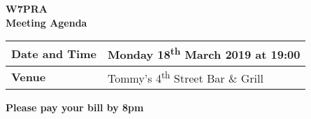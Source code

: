 \documentclass[letter,11pt]{extarticle}
\begin{document}
	\thispagestyle{empty}
	
	\begin{center}
		\textbf{W7PRA\\Meeting Agenda}
		\vspace{0.33cm}
	\end{center}
	
	\begin{center}
		\begin{tabular}{| m{3.0cm} | m{7.5cm} |} \hline
			\textbf{Date and Time} & Monday 18\textsuperscript{th} March 2019 at 19:00 \\ \hline
			\textbf{Venue} & Tommy's 4\textsuperscript{th} Street Bar \& Grill \\ \hline
				\end{tabular}
	\end{center}
	
	\begin{center}
		\textbf{Please pay your bill by 8pm}
	\end{center}
	
\end{document}

